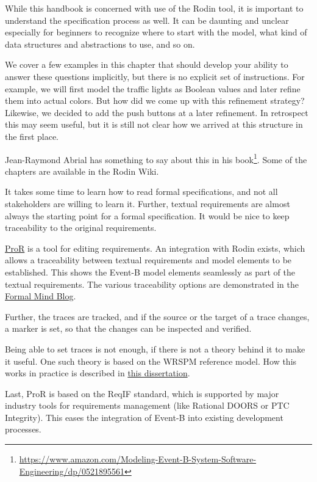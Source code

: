 While this handbook is concerned with use of the Rodin tool, it is important to understand the specification process as well.  It can be daunting and unclear especially for beginners to recognize where to start with the model, what kind of data structures and abstractions to use, and so on.

We cover a few examples in this chapter that should develop your ability to answer these questions implicitly, but there is no explicit set of instructions.  For example, we will first model the traffic lights as Boolean values and later refine them into actual colors.  But how did we come up with this refinement strategy?  Likewise, we decided to add the push buttons at a later refinement.  In retrospect this may seem useful, but it is still not clear how we arrived at this structure in the first place.

Jean-Raymond Abrial has something to say about this in his book\footnote{\url{https://www.amazon.com/Modeling-Event-B-System-Software-Engineering/dp/0521895561}}. Some of the chapters are available in the Rodin Wiki.

\begin{plugin-pror}

It takes some time to learn how to read formal specifications, and not all stakeholders are willing to learn it.  Further, textual requirements are almost always the starting point for a formal specification.  It would be nice to keep traceability to the original requirements.

\href{https://wiki.event-b.org/index.php/ProR}{ProR} is a tool for editing requirements.  An integration with Rodin exists, which allows a traceability between textual requirements and model elements to be established.  This shows the Event-B model elements seamlessly as part of the textual requirements.  The various traceability options are demonstrated in the \href{https://www.formalmind.com/en/blog/using-rmf-integrate-your-models}{Formal Mind Blog}.

Further, the traces are tracked, and if the source or the target of a trace changes, a marker is set, so that the changes can be inspected and verified.

Being able to set traces is not enough, if there is not a theory behind it to make it useful.  One such theory is based on the WRSPM reference model.  How this works in practice is described in \href{https://docserv.uni-duesseldorf.de/servlets/DerivateServlet/Derivate-23358}{this dissertation}.

Last, ProR is based on the ReqIF standard, which is supported by major industry tools for requirements management (like Rational DOORS or PTC Integrity).  This eases the integration of Event-B into existing development processes.
\end{plugin-pror}

